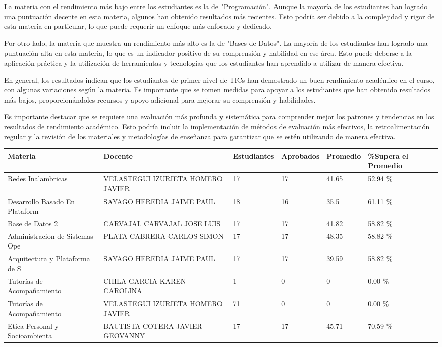 La materia con el rendimiento más bajo entre los estudiantes es la de "Programación". Aunque la mayoría de los estudiantes han logrado una puntuación decente en esta materia, algunos han obtenido resultados más recientes. Esto podría ser debido a la complejidad y rigor de esta materia en particular, lo que puede requerir un enfoque más enfocado y dedicado.

Por otro lado, la materia que muestra un rendimiento más alto es la de "Bases de Datos". La mayoría de los estudiantes han logrado una puntuación alta en esta materia, lo que es un indicador positivo de su comprensión y habilidad en ese área. Esto puede deberse a la aplicación práctica y la utilización de herramientas y tecnologías que los estudiantes han aprendido a utilizar de manera efectiva.

En general, los resultados indican que los estudiantes de primer nivel de TICs han demostrado un buen rendimiento académico en el curso, con algunas variaciones según la materia. Es importante que se tomen medidas para apoyar a los estudiantes que han obtenido resultados más bajos, proporcionándoles recursos y apoyo adicional para mejorar su comprensión y habilidades.

Es importante destacar que se requiere una evaluación más profunda y sistemática para comprender mejor los patrones y tendencias en los resultados de rendimiento académico. Esto podría incluir la implementación de métodos de evaluación más efectivos, la retroalimentación regular y la revisión de los materiales y metodologías de enseñanza para garantizar que se estén utilizando de manera efectiva.\\
\vspace{1cm}\small
\begin{tabularx}{\textwidth}{|p{2.5cm}|p{2.5cm}|X|X|X|X|}
\hline
\textbf{Materia} & \textbf{Docente} & \textbf{Estudiantes} & \textbf{Aprobados} & \textbf{Promedio} & \textbf{\%Supera el Promedio} \\ \hline
Redes Inalambricas & VELASTEGUI IZURIETA HOMERO JAVIER & 17 & 17 & 41.65 & 52.94 \%\\ \hline
Desarrollo Basado En Plataform & SAYAGO HEREDIA JAIME PAUL & 18 & 16 & 35.5 & 61.11 \%\\ \hline
Base de Datos 2 & CARVAJAL CARVAJAL JOSE LUIS & 17 & 17 & 41.82 & 58.82 \%\\ \hline
Administracion de Sistemas Ope & PLATA CABRERA CARLOS SIMON & 17 & 17 & 48.35 & 58.82 \%\\ \hline
Arquitectura y Plataforma de S & SAYAGO HEREDIA JAIME PAUL & 17 & 17 & 39.59 & 58.82 \%\\ \hline
Tutorías de Acompañamiento & CHILA GARCIA KAREN CAROLINA & 1 & 0 & 0 & 0.00 \%\\ \hline
Tutorías de Acompañamiento & VELASTEGUI IZURIETA HOMERO JAVIER & 71 & 0 & 0 & 0.00 \%\\ \hline
Etica Personal y Socioambienta & BAUTISTA COTERA JAVIER GEOVANNY & 17 & 17 & 45.71 & 70.59 \%\\ \hline
\end{tabularx}

